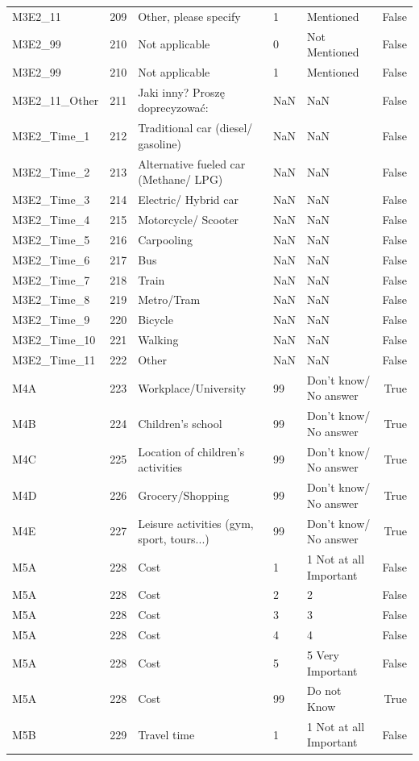 \begin{tabular}{lrlllr}
M3E2_11 & 209 & Other, please specify & 1 & Mentioned & False \\
M3E2_99 & 210 & Not applicable & 0 & Not Mentioned & False \\
M3E2_99 & 210 & Not applicable & 1 & Mentioned & False \\
M3E2_11_Other & 211 & Jaki inny? Proszę doprecyzować: & NaN & NaN & False \\
M3E2_Time_1 & 212 & Traditional car (diesel/ gasoline) & NaN & NaN & False \\
M3E2_Time_2 & 213 & Alternative fueled car (Methane/ LPG) & NaN & NaN & False \\
M3E2_Time_3 & 214 & Electric/ Hybrid car & NaN & NaN & False \\
M3E2_Time_4 & 215 & Motorcycle/ Scooter & NaN & NaN & False \\
M3E2_Time_5 & 216 & Carpooling & NaN & NaN & False \\
M3E2_Time_6 & 217 & Bus & NaN & NaN & False \\
M3E2_Time_7 & 218 & Train & NaN & NaN & False \\
M3E2_Time_8 & 219 & Metro/Tram & NaN & NaN & False \\
M3E2_Time_9 & 220 & Bicycle & NaN & NaN & False \\
M3E2_Time_10 & 221 & Walking & NaN & NaN & False \\
M3E2_Time_11 & 222 & Other & NaN & NaN & False \\
M4A & 223 & Workplace/University & 99 & Don't know/ No answer & True \\
M4B & 224 & Children’s school & 99 & Don't know/ No answer & True \\
M4C & 225 & Location of children’s activities & 99 & Don't know/ No answer & True \\
M4D & 226 & Grocery/Shopping & 99 & Don't know/ No answer & True \\
M4E & 227 & Leisure activities (gym, sport, tours...) & 99 & Don't know/ No answer & True \\
M5A & 228 & Cost & 1 & 1 Not at all Important & False \\
M5A & 228 & Cost & 2 & 2 & False \\
M5A & 228 & Cost & 3 & 3 & False \\
M5A & 228 & Cost & 4 & 4 & False \\
M5A & 228 & Cost & 5 & 5 Very Important & False \\
M5A & 228 & Cost & 99 & Do not Know & True \\
M5B & 229 & Travel time & 1 & 1 Not at all Important & False \\

\end{tabular}
